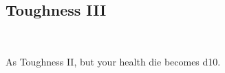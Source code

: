 \subsection*{Toughness III}\label{feat:toughness3}
 \\

As Toughness II, but your health die becomes d10.
